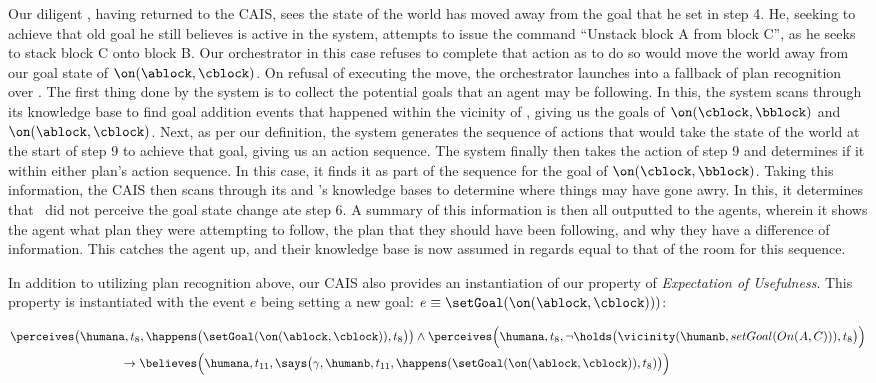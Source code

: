 Our diligent \humanb, having returned to the CAIS, sees the state of the world
has moved away from the goal that he set in step 4. He, seeking to achieve that
old goal he still believes is active in the system, attempts to issue the command
``Unstack block A from block C'', as he seeks to stack block C onto block B. Our
orchestrator in this case refuses to complete that action as to do so would
move the world away from our goal state of $\on(\ablock, \cblock)$. On refusal
of executing the move, the orchestrator launches into a fallback of plan recognition
over \humanb. The first thing done by the system is to collect the potential goals
that an agent may be following. In this, the system scans through its knowledge base
to find goal addition events that happened within the vicinity of \humanb, giving
us the goals of $\on(\cblock, \bblock)$ and $\on(\ablock, \cblock)$. Next, as per
our definition, the system generates the sequence of actions that would take the
state of the world at the start of step 9 to achieve that goal, giving us an
action sequence. The system finally then takes the action of step 9 and determines
if it within either plan's action sequence. In this case, it finds it as part of
the sequence for the goal of $\on(\cblock, \bblock)$. Taking this information, the
CAIS then scans through its and \humanb's knowledge bases to determine where things
may have gone awry. In this, it determines that \humanb\ did not perceive the goal
state change ate step 6. A summary of this information is then all outputted to the
agents, wherein it shows the agent what plan they were attempting to follow, the plan
that they should have been following, and why they have a difference of information.
This catches the agent up, and their knowledge base is now assumed in regards equal
to that of the room for this sequence.

In addition to utilizing plan recognition above, our CAIS also provides an instantiation
of our property of \textit{Expectation of Usefulness}. This property is
instantiated with the event $e$ being setting a new goal:
$e \equiv \setGoal(\on(\ablock, \cblock)))$:

\begin{footnotesize}
\begin{equation*}
\begin{aligned}
&\perceives\big(\humana, t_8, \happens\big(\setGoal(\on(\ablock,\cblock)), t_{8}\big)\big) \land \perceives\Big(\humana, t_8, \lnot \holds\big(\vicinity(\humanb, setGoal (On(A,C))), t_8\big)\Big) \\
& \hspace{90pt} \rightarrow \believes\Big(\humana, t_{11}, \says\big(\gamma, \humanb, t_{11},
\happens(\setGoal(\on(\ablock,\cblock)), t_8)\big)\Big)
\end{aligned}
\end{equation*}
\end{footnotesize}
